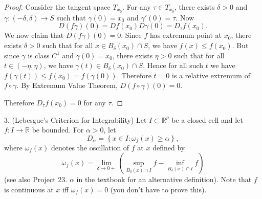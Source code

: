 \begin{proof}
	Consider the tangent space $T_{x_0}$. For any $\tau \in T_{x_0}$, there exists $\delta>0$ and $\gamma:(-\delta, \delta) \to S$ such that $\gamma(0) = x_0$ and $\gamma'(0) = \tau$. Now
	\[
		D(f\gamma)(0) = Df(x_0)D\gamma(0) = D_\tau f(x_0)
	.\] 
	We now claim that $D(f \gamma)(0) = 0$. Since $f$ has extremum point at $x_0$, there exists $\delta>0$ such that for all $x \in B_\delta(x_0) \cap S$, we have $f(x) \le  f(x_0)$. But since $\gamma$ is class $C^1$ and $\gamma(0) = x_0$, there exists $\eta>0$ such that for all $t \in (-\eta, \eta)$, we have $\gamma(t) \in B_\delta(x_0) \cap S$. Hence for all such $t$ we have $f(\gamma(t)) \le f(x_0) =  f(\gamma(0))$. Therefore $t=0$ is a relative extremum of $f \circ \gamma$. By Extremum Value Theorem, $D(f \circ \gamma)(0) = 0$.

	Therefore $D_\tau f(x_0) = 0$ for any $\tau$.
\end{proof}

\newpage

3. (Lebesgue's Criterion for Integrability)
Let $I \subset \mathbb{R}^p$ be a closed cell and let $f: I \rightarrow \mathbb{R}$ be bounded. For $\alpha>0$, let
\[
D_\alpha=\left\{x \in I: \omega_f(x) \geq \alpha\right\},
\]
where $\omega_f(x)$ denotes the oscillation of $f$ at $x$ defined by
\[
\omega_f(x)=\lim _{\delta \rightarrow 0+}\left(\sup _{B_\delta(x) \cap I} f-\inf _{B_\delta(x) \cap I} f\right)
\]
(see also Project 23. $\alpha$ in the textbook for an alternative definition). Note that $f$ is continuous at $x$ iff $\omega_f(x)=0$ (you don't have to prove this).

